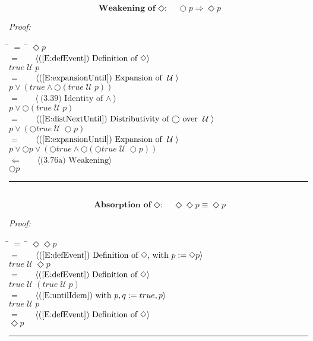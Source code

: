 \documentclass[fleqn, leqno]{article}
\newcommand{\lgap}{2pt}                             %
\newcommand{\mymathindent}{24pt}                    %
\newcommand{\Until}{\;\mathcal{U}\;}
\newcommand{\Next}{\bigcirc}
\newcommand{\Event}{\Diamond}
\newcommand{\myqed}{\hfill\rule[-.23ex]{1.2ex}{2.0ex}}
\newcommand{\Gll} {\langle}                         %
\newcommand{\Ggg} {\rangle}                         %
\newcommand{\Hint}[1]     {\ \ \ $\Gll              \mbox{#1} \Ggg$ }   %
\begin{document}
\begin{equation}\label{E:nextEvent}
\textbf{Weakening of $\Event$:}\quad \Next p \Rightarrow \Event p
\end{equation}

\emph{Proof:}
\begin{tabbing}
\hspace{\mymathindent} \= $= \;$ \= \kill
  \> \>   $\Event p$\\[\lgap]
  \> $=$  \>  \Hint{(\ref{E:defEvent}) Definition of $\Event$}\\[\lgap]
  \> \>   $true \Until p$\\[\lgap]
  \> $=$  \>  \Hint{(\ref{E:expansionUntil}) Expansion of $\Until$}\\[\lgap]
  \> \>   $p \lor (true \land \Next(true \Until p))$\\[\lgap]
  \> $=$  \>  \Hint{(3.39) Identity of $\land$}\\[\lgap]
  \> \>   $p \lor \Next(true \Until p)$\\[\lgap]
  \> $=$  \>  \Hint{(\ref{E:distNextUntil}) Distributivity of $\Next$ over $\Until$}\\[\lgap]
  \> \>   $p \lor (\Next true \Until \Next p)$\\[\lgap]
  \> $=$  \>  \Hint{(\ref{E:expansionUntil}) Expansion of $\Until$}\\[\lgap]
  \> \>   $p \lor \Next p \lor (\Next true \land \Next(\Next true \Until \Next p))$\\[\lgap]
  \> $\Leftarrow$ \> \Hint{(3.76a) Weakening}\\[\lgap]
  \> \>   $\Next p$\\[\lgap]
\end{tabbing}
\myqed\\[\lgap]


\begin{equation}\label{E:IdemEvent}
\textbf{Absorption of $\Event$:}\quad \Event\Event p \equiv \Event p
\end{equation}

\emph{Proof:}
\begin{tabbing}
\hspace{\mymathindent} \= $= \;$ \= \kill
  \> \>   $\Event\Event p$\\[\lgap]
  \> $=$  \>  \Hint{(\ref{E:defEvent}) Definition of $\Event$, with $p := \Event p$}\\[\lgap]
  \> \>   $true \Until \Event p$\\[\lgap]
  \> $=$  \>  \Hint{(\ref{E:defEvent}) Definition of $\Event$}\\[\lgap]
  \> \>   $true \Until (true \Until p)$\\[\lgap]
  \> $=$  \>  \Hint{(\ref{E:untilIdem}) with $p,q := true,p$}\\[\lgap]
  \> \>   $true \Until p$\\[\lgap]
  \> $=$  \>  \Hint{(\ref{E:defEvent}) Definition of $\Event$}\\[\lgap]
  \> \>   $\Event p$\\[\lgap]
\end{tabbing}
\myqed\\[\lgap]
\end{document}
